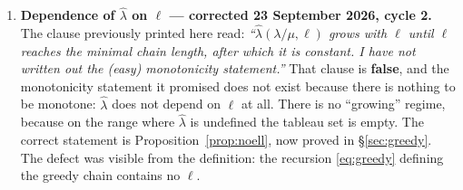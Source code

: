 \documentclass[11pt]{article}
\theoremstyle{plain}
\theoremstyle{definition}
\begin{document}
\begin{enumerate}
Still not proved, and not used: $Q=\mathcal{P}_{\hat\lambda}$ for the polyhedron $Q$ of
Theorem~\ref{thm:snp}, i.e.\ the real-coefficient form of Rado's theorem. Only
$\mathrm{conv}(W_\ell)\subseteq Q$ is needed and only that is proved.
Lemma~\ref{lem:JJ} now has a written proof \emph{and} a machine-checked one
(Remark~\ref{rem:mconvex-erratum}). What is still outside the Lean record is Murota's
\emph{symmetric} exchange axiom, which is checked by brute force only.
\item \textbf{Dependence of $\hat\lambda$ on $\ell$ --- corrected 23 September 2026,
cycle 2.} The clause previously printed here read: \emph{``$\hat\lambda(\lambda/\mu,\ell)$
grows with $\ell$ until $\ell$ reaches the minimal chain length, after which it is constant.
I have not written out the (easy) monotonicity statement.''} That clause is \textbf{false},
and the monotonicity statement it promised does not exist because there is nothing to be
monotone: $\hat\lambda$ does not depend on $\ell$ at all. There is no ``growing'' regime,
because on the range where $\hat\lambda$ is undefined the tableau set is empty. The correct
statement is Proposition~\ref{prop:noell}, now proved in \S\ref{sec:greedy}. The defect was
visible from the definition: the recursion \eqref{eq:greedy} defining the greedy chain
contains no $\ell$.
\end{enumerate}
\end{document}
